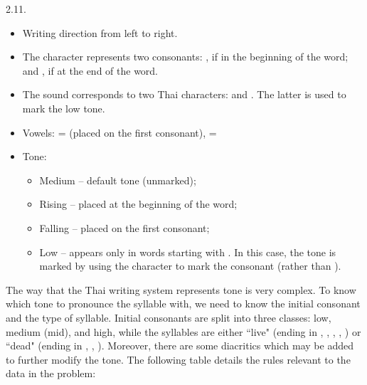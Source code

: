 \begin{refsection}
\begin{practiceproblemsolution}{2.11. \langnameThai}
\begin{itemize}
    \item Writing direction from left to right.
    \item The character  represents two consonants: , if in the beginning of the word; and , if at the end of the word.
    \item The sound  corresponds to two Thai characters:  and . The latter is used to mark the low tone.
    \item Vowels:  =  (placed on the first consonant),  = 
    \item Tone:
    \begin{itemize}

        \item Medium -- default tone (unmarked);
        \item Rising --  placed at the beginning of the word;
        \item Falling --  placed on the first consonant;
        \item Low -- appears only in words starting with . In this case, the tone is marked by using the character  to mark the consonant  (rather than ).
    \end{itemize}
\end{itemize}
\end{practiceproblemsolution}

\begin{discussion}

The way that the Thai writing system represents tone is very complex. To know which tone to pronounce the syllable with, we need to know the initial consonant and the type of syllable. Initial consonants are split into three classes: low, medium (mid), and high, while the syllables are either ``live" (ending in , , , , ) or ``dead" (ending in , , ). Moreover, there are some diacritics which may be added to further modify the tone. The following table details the rules relevant to the data in the problem:


\end{discussion}
\end{refsection}
